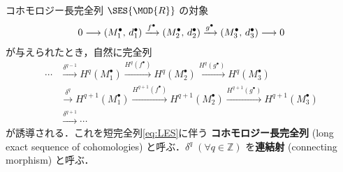 \documentclass[algtopo_main]{subfiles}
\begin{document}
\begin{myprop}[label=prop:LES-cohomology]{コホモロジー長完全列}
    $\SES{\MOD{R}}$ の対象
    \begin{align}
        \label{eq:LES}
        0 \longrightarrow (M_1^\bullet,\, d_1^\bullet) \xrightarrow{f^\bullet} (M_2^\bullet,\, d_2^\bullet) \xrightarrow{g^\bullet} (M_3^\bullet,\, d_3^\bullet) \longrightarrow 0
    \end{align}
    が与えられたとき，自然に完全列
    \begin{align}
        \cdots &\xrightarrow{\delta^{q-1}} H^q(M_1^\bullet) \xrightarrow{H^q(f^\bullet)} H^q(M_2^\bullet) \xrightarrow{H^q(g^\bullet)} H^q(M_3^\bullet) \\
        &\xrightarrow{\delta^{q}} H^{q+1}(M_1^\bullet) \xrightarrow{H^{q+1}(f^\bullet)} H^{q+1}(M_2^\bullet) \xrightarrow{H^{q+1}(g^\bullet)} H^{q+1}(M_3^\bullet) \\
        &\xrightarrow{\delta^{q+1}} \cdots
    \end{align}
    が誘導される．これを短完全列\eqref{eq:LES}に伴う \textbf{コホモロジー長完全列} (long exact sequence of cohomologies) と呼ぶ．$\delta^q\; (\forall q \in \mathbb{Z})$ を\textbf{連結射} (connecting morphism) と呼ぶ．
\end{myprop}
\end{document}
